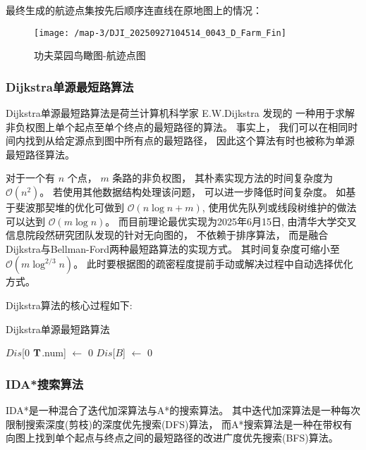 \documentclass[12pt,a4paper,oneside,UTF8]{ctexart}
\begin{document}
最终生成的航迹点集按先后顺序连直线在原地图上的情况：

\begin{figure}[H]
  \centering
  \texttt{[image: /map-3/DJI\_20250927104514\_0043\_D\_Farm\_Fin]}
  \caption{功夫菜园鸟瞰图-航迹点图}
  \label{fig:map-3-farm-fin}
\end{figure}

\subsubsection{Dijkstra单源最短路算法}
Dijkstra单源最短路算法是荷兰计算机科学家 E.W.Dijkstra 发现的
一种用于求解非负权图上单个起点至单个终点的最短路径的算法。
事实上，
我们可以在相同时间内找到从给定源点到图中所有点的最短路径，
因此这个算法有时也被称为单源最短路径算法\textsuperscript{\cite{ref4}}。

对于一个有 $n$ 个点，
$m$ 条路的非负权图，
其朴素实现方法的时间复杂度为 $\mathcal{O}(n^2)$。
若使用其他数据结构处理该问题，
可以进一步降低时间复杂度。
如基于斐波那契堆的优化可做到 $\mathcal{O}(n \log n + m)$,
使用优先队列或线段树维护的做法可以达到 $\mathcal{O}(m \log n)$。
而目前理论最优实现为2025年6月15日,
由清华大学交叉信息院段然研究团队发现的针对无向图的，
不依赖于排序算法，
而是融合Dijkstra与Bellman-Ford两种最短路算法的实现方式。
其时间复杂度可缩小至 $\mathcal{O}(m \log ^{2/3} n)$\textsuperscript{\cite{ref5}}。
此时要根据图的疏密程度提前手动或解决过程中自动选择优化方式。

Dijkstra算法的核心过程如下:

\begin{algorithm}[H]
  \caption{Dijkstra单源最短路算法}\label{algorithm-traditional-Dijkstra}

  $Dis$[$0$ \KwTo $\bf{T}$.num] $\leftarrow$ 0\;
  $Dis$[$B$] $\leftarrow$ 0\;
\end{algorithm}

\subsubsection{IDA*搜索算法}
IDA*是一种混合了迭代加深算法与A*的搜索算法。
其中迭代加深算法是一种每次限制搜索深度(剪枝)的深度优先搜索(DFS)算法，
而A*搜索算法是一种在带权有向图上找到单个起点与终点之间的最短路径的改进广度优先搜索(BFS)算法。
\end{document}
